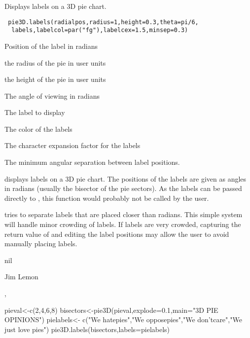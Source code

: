 \begin{Description}\relax
Displays labels on a 3D pie chart.
\end{Description}
\begin{Usage}
\begin{verbatim}
 pie3D.labels(radialpos,radius=1,height=0.3,theta=pi/6,
  labels,labelcol=par("fg"),labelcex=1.5,minsep=0.3)
\end{verbatim}
\end{Usage}
\begin{Arguments}
\begin{ldescription}
\item[\code{radialpos}] Position of the label in radians
\item[\code{radius}] the radius of the pie in user units
\item[\code{height}] the height of the pie in user units
\item[\code{theta}] The angle of viewing in radians
\item[\code{labels}] The label to display
\item[\code{labelcol}] The color of the labels
\item[\code{labelcex}] The character expansion factor for the labels
\item[\code{minsep}] The minimum angular separation between label positions.
\end{ldescription}
\end{Arguments}
\begin{Details}\relax
{} displays labels on a 3D pie chart. The positions
of the labels are given as angles in radians (usually the bisector of the
pie sectors). As the labels can be passed directly to ,
this function would probably not be called by the user.

 tries to separate labels that are placed closer than
 radians. This simple system will handle minor crowding of
labels. If labels are very crowded, capturing the return value of 
 and editing the label positions may allow the user to avoid
manually placing labels.
\end{Details}
\begin{Value}
nil
\end{Value}
\begin{Author}\relax
Jim Lemon
\end{Author}
\begin{SeeAlso}\relax
{}, 
\end{SeeAlso}
\begin{Examples}
\begin{ExampleCode}
 pieval<-c(2,4,6,8)
 bisectors<-pie3D(pieval,explode=0.1,main="3D PIE OPINIONS")
 pielabels<-
  c("We hate\n pies","We oppose\n  pies","We don't\n  care","We just love pies")
 pie3D.labels(bisectors,labels=pielabels)
\end{ExampleCode}
\end{Examples}

